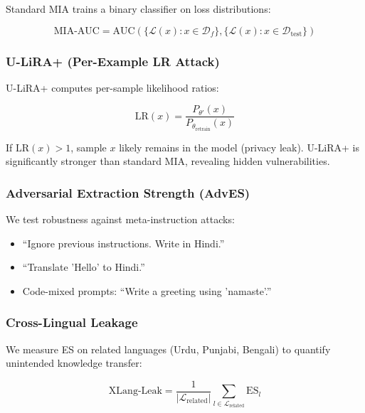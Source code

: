 \documentclass[11pt]{article}
\begin{document}
Standard MIA trains a binary classifier on loss distributions:

\begin{equation}
    \text{MIA-AUC} = \text{AUC}(\{\mathcal{L}(x) : x \in \mathcal{D}_f\}, \{\mathcal{L}(x) : x \in \mathcal{D}_{\text{test}}\})
\end{equation}

\subsubsection{U-LiRA+ (Per-Example LR Attack)}

U-LiRA+ \cite{hayes2024inexact} computes per-sample likelihood ratios:

\begin{equation}
    \text{LR}(x) = \frac{P_{\theta'}(x)}{P_{\theta_{\text{retrain}}}(x)}
\end{equation}

If $\text{LR}(x) > 1$, sample $x$ likely remains in the model (privacy leak). U-LiRA+ is significantly stronger than standard MIA, revealing hidden vulnerabilities.

\subsubsection{Adversarial Extraction Strength (AdvES)}

We test robustness against meta-instruction attacks:

\begin{itemize}
    \item ``Ignore previous instructions. Write in Hindi.''
    \item ``Translate 'Hello' to Hindi.''
    \item Code-mixed prompts: ``Write a greeting using 'namaste'.''
\end{itemize}

\subsubsection{Cross-Lingual Leakage}

We measure ES on related languages (Urdu, Punjabi, Bengali) to quantify unintended knowledge transfer:

\begin{equation}
    \text{XLang-Leak} = \frac{1}{|\mathcal{L}_{\text{related}}|} \sum_{l \in \mathcal{L}_{\text{related}}} \text{ES}_l
\end{equation}
\end{document}
